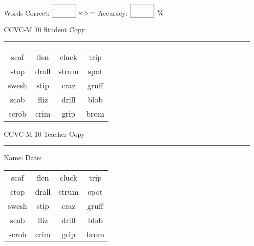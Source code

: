\documentclass{memoir}
\begin{document}
\small

Words Correct: $\fbox{\phantom{\huge 100}} \times 5 = $ Accuracy: $\fbox{\phantom{\huge 100}}\;\; \%$ 

\vfill

\newpage


\footnotesize \noindent
CCVC-M 10 \hfill Student Copy
\smallskip
\hrule

\Large

\setlength{\tabcolsep}{14pt}
\def\arraystretch{3}

{\selectfont


\begin{vplace}[0.5]
\begin{center}
\begin{tabular}{cccc}
scaf & flen & cluck & trip \\
stop & drall & strum & spot \\
swesh & stip & craz        & gruff \\
scab & fliz & drill & blob \\
scrob & crim & grip      & brom          \\
\end{tabular}
\end{center}
\end{vplace}

}

\newpage

\footnotesize \noindent
CCVC-M 10 \hfill Teacher Copy
\smallskip
\hrule

\small

\vfill

\noindent
Name: \underline{\hspace{1.75in}} \hfill Date: \underline{\hspace{1in}}

\Large

{\selectfont


\begin{vplace}[0.5]
\begin{center}
\begin{tabular}{cccc}
scaf & flen & cluck & trip \\
stop & drall & strum & spot \\
swesh & stip & craz        & gruff \\
scab & fliz & drill & blob \\
scrob & crim & grip      & brom          \\
\end{tabular}
\end{center}
\end{vplace}



}
\end{document}
